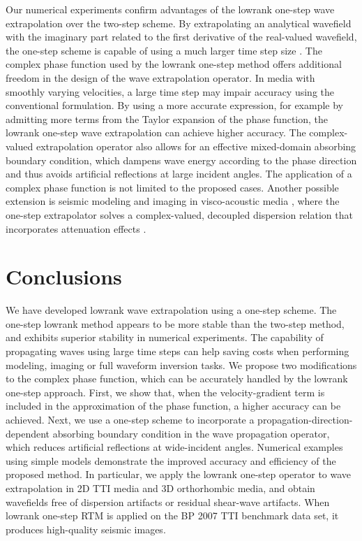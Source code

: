 Our numerical experiments confirm advantages of the lowrank one-step wave extrapolation over the two-step scheme. By extrapolating an analytical wavefield with the imaginary part related to the first derivative of the real-valued wavefield, the one-step scheme is capable of using a much larger time step size \cite[]{rite}. The complex phase function used by the lowrank one-step method offers additional freedom in the design of the wave extrapolation operator. In media with smoothly varying velocities, a large time step may impair accuracy using the conventional formulation. By using a more accurate expression, for example by admitting more terms from the Taylor expansion of the phase function, the lowrank one-step wave extrapolation can achieve higher accuracy. The complex-valued extrapolation operator also allows for an effective mixed-domain absorbing boundary condition, which dampens wave energy according to the phase direction and thus avoids artificial reflections at large incident angles. The application of a complex phase function is not limited to the proposed cases. Another possible extension is seismic modeling and imaging in visco-acoustic media \cite[]{zhu14a}, where the one-step extrapolator solves a complex-valued, decoupled dispersion relation that incorporates attenuation effects \cite[]{sun14,sun15a}. 

\section{Conclusions}

We have developed lowrank wave extrapolation using a one-step scheme. The one-step lowrank method appears to be more stable than the two-step method, and exhibits superior stability in numerical experiments. The capability of propagating waves using large time steps can help saving costs when performing modeling, imaging or full waveform inversion tasks. We propose two modifications to the complex phase function, which can be accurately handled by the lowrank one-step approach. First, we show that, when the velocity-gradient term is included in the approximation of the phase function, a higher accuracy can be achieved. Next, we use a one-step scheme to incorporate a propagation-direction-dependent absorbing boundary condition in the wave propagation operator, which reduces artificial reflections at wide-incident angles. Numerical examples using simple models demonstrate the improved accuracy and efficiency of the proposed method. In particular, we apply the lowrank one-step operator to wave extrapolation in 2D TTI media and 3D orthorhombic media, and obtain wavefields free of dispersion artifacts or residual shear-wave artifacts. When lowrank one-step RTM is applied on the BP 2007 TTI benchmark data set, it produces high-quality seismic images.

